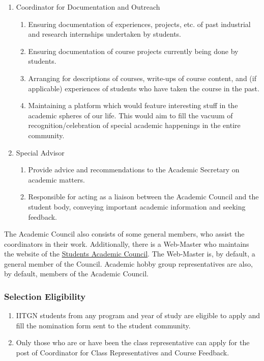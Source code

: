 \documentclass[12pt]{article}
\begin{document}
\begin{enumerate}
\begin{enumerate}
        \item Ensuring that CRs undertake at least one initiative or activity for their discipline’s batch.
        \item Maintaining an archive of minutes of meetings conducted by CRs with their respective batches.
    \end{enumerate}
    \item Coordinator for Documentation and Outreach
    \begin{enumerate}
        \item Ensuring documentation of experiences, projects, etc. of past industrial and research internships undertaken by students.
        \item Ensuring documentation of course projects currently being done by students.
        \item Arranging for descriptions of courses, write-ups of course content, and (if applicable) experiences of students who have taken the course in the past.
        \item Maintaining a platform which would feature interesting stuff in the academic spheres of our life. This would aim to fill the vacuum of recognition/celebration of special academic happenings in the entire community.
    \end{enumerate}
    \item Special Advisor
    \begin{enumerate}
        \item Provide advice and recommendations to the Academic Secretary on academic matters.
        \item Responsible for acting as a liaison between the Academic Council and the student body, conveying important academic information and seeking feedback.
    \end{enumerate}
\end{enumerate}

\noindent The Academic Council also consists of some general members, who assist the coordinators in their work. Additionally, there is a Web-Master who maintains the website of the \href{https://students.iitgn.ac.in/student-academic-council/}{Students Academic Council}. The Web-Master is, by default, a general member of the Council. Academic hobby group representatives are also, by default, members of the Academic Council.

\subsubsection{Selection Eligibility}
\begin{enumerate}
    \item IITGN students from any program and year of study are eligible to apply and fill the nomination form sent to the student community.
    \item Only those who are or have been the class representative can apply for the post of Coordinator for Class Representatives and Course Feedback.
\end{enumerate}
\end{document}
